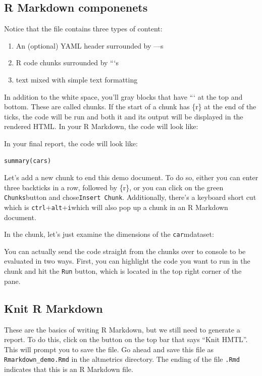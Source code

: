 \documentclass[
]{book}
\providecommand{\tightlist}{%
  \setlength{\itemsep}{0pt}\setlength{\parskip}{0pt}}
\begin{document}
\hypertarget{r-markdown-componenets}{%
\subsection{R Markdown componenets}\label{r-markdown-componenets}}

Notice that the file contains three types of content:

\begin{enumerate}
\def\labelenumi{\arabic{enumi}.}
\tightlist
\item
  An (optional) YAML header surrounded by ---s
\item
  R code chunks surrounded by ```s
\item
  text mixed with simple text formatting
\end{enumerate}

In addition to the white space, you'll gray blocks that have ``` at the top and bottom. These are called chunks. If the start of a chunk has \{r\} at the end of the ticks, the code will be run and both it and its output will be displayed in the rendered HTML. In your R Markdown, the code will look like:

In your final report, the code will look like:

\begin{verbatim}
summary(cars)
\end{verbatim}

Let's add a new chunk to end this demo document. To do so, either you can enter three backticks in a row, followed by \{r\}, or you can click on the green \texttt{Chunks}button and chose\texttt{Insert\ Chunk}. Additionally, there's a keyboard short cut which is \texttt{ctrl}+\texttt{alt}+\texttt{i}which will also pop up a chunk in an R Markdown document.

In the chunk, let's just examine the dimensions of the \texttt{car}mdataset:

You can actually send the code straight from the chunks over to console to be evaluated in two ways. First, you can highlight the code you want to run in the chunk and hit the \texttt{Run} button, which is located in the top right corner of the pane.

\hypertarget{knit-r-markdown}{%
\subsection{Knit R Markdown}\label{knit-r-markdown}}

These are the basics of writing R Markdown, but we still need to generate a report. To do this, click on the button on the top bar that says ``Knit HMTL''. This will prompt you to save the file. Go ahead and save this file as \texttt{Rmarkdown\_demo.Rmd} in the altmetrics directory. The ending of the file \texttt{.Rmd} indicates that this is an R Markdown file.
\end{document}
